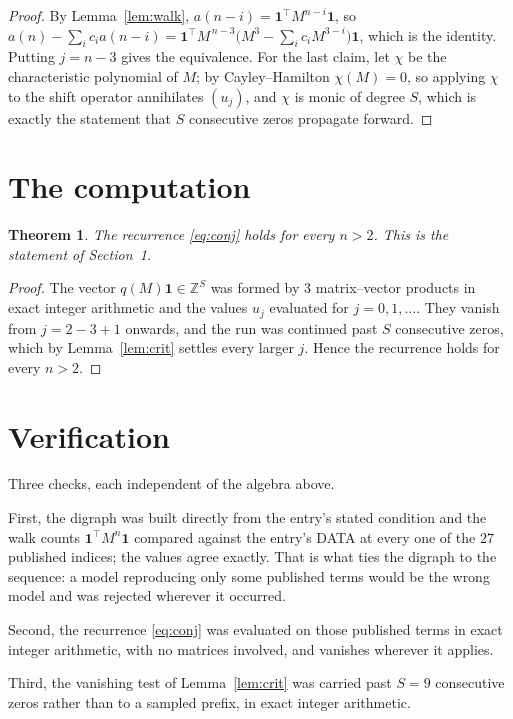 \documentclass[11pt,a4paper]{article}
\theoremstyle{plain}
\newtheorem{theorem}{Theorem}
\theoremstyle{definition}
\begin{document}
\begin{proof}
By Lemma~\ref{lem:walk}, $a(n-i)=\mathbf{1}^{\!\top}M^{n-i}\mathbf{1}$, so
$a(n)-\sum_i c_i a(n-i)
=\mathbf{1}^{\!\top}M^{\,n-3}\bigl(M^{3}-\sum_i c_i M^{3-i}\bigr)
\mathbf{1}$, which is the identity. Putting $j=n-3$ gives the equivalence. For the
last claim, let $\chi$ be the characteristic polynomial of $M$; by Cayley--Hamilton
$\chi(M)=0$, so applying $\chi$ to the shift operator annihilates $(u_j)$, and $\chi$ is
monic of degree $S$, which is exactly the statement that $S$ consecutive zeros propagate
forward.
\end{proof}

\section{The computation}

\begin{theorem}
The recurrence \eqref{eq:conj} holds for every $n>2$. This is the statement of
Section~1.
\end{theorem}

\begin{proof}
The vector $q(M)\mathbf{1}\in\mathbb{Z}^{S}$ was formed by $3$ matrix--vector
products in exact integer arithmetic and the values $u_j$ evaluated for
$j=0,1,\dots$. They vanish from $j=2-3+1$ onwards, and the run was continued past
$S$ consecutive zeros, which by Lemma~\ref{lem:crit} settles every larger $j$. Hence the
recurrence holds for every $n>2$.
\end{proof}

\section{Verification}

Three checks, each independent of the algebra above.

First, the digraph was built directly from the entry's stated condition and the walk counts
$\mathbf{1}^{\!\top}M^{n}\mathbf{1}$ compared against the entry's DATA at every one of
the $27$ published indices; the values agree exactly. That is what ties the digraph to
the sequence: a model reproducing only some published terms would be the wrong model and
was rejected wherever it occurred.

Second, the recurrence \eqref{eq:conj} was evaluated on those published terms in exact
integer arithmetic, with no matrices involved, and vanishes wherever it applies.

Third, the vanishing test of Lemma~\ref{lem:crit} was carried past $S=9$ consecutive
zeros rather than to a sampled prefix, in exact integer arithmetic.
\end{document}
